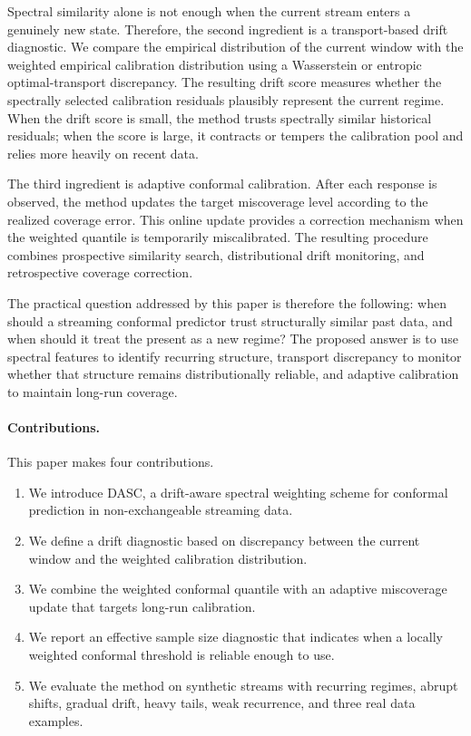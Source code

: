 \documentclass[11pt]{article}
\begin{document}
Spectral similarity alone is not enough when the current stream enters a genuinely new state. Therefore, the second ingredient is a transport-based drift diagnostic. We compare the empirical distribution of the current window with the weighted empirical calibration distribution using a Wasserstein or entropic optimal-transport discrepancy. The resulting drift score measures whether the spectrally selected calibration residuals plausibly represent the current regime. When the drift score is small, the method trusts spectrally similar historical residuals; when the score is large, it contracts or tempers the calibration pool and relies more heavily on recent data.

The third ingredient is adaptive conformal calibration. After each response is observed, the method updates the target miscoverage level according to the realized coverage error. This online update provides a correction mechanism when the weighted quantile is temporarily miscalibrated. The resulting procedure combines prospective similarity search, distributional drift monitoring, and retrospective coverage correction.

The practical question addressed by this paper is therefore the following: when should a streaming conformal predictor trust structurally similar past data, and when should it treat the present as a new regime? The proposed answer is to use spectral features to identify recurring structure, transport discrepancy to monitor whether that structure remains distributionally reliable, and adaptive calibration to maintain long-run coverage.

\paragraph{Contributions.}
This paper makes four contributions.
\begin{enumerate}[label=(\roman*)]
    \item We introduce DASC, a drift-aware spectral weighting scheme for conformal prediction in non-exchangeable streaming data.
    \item We define a drift diagnostic based on discrepancy between the current window and the weighted calibration distribution.
    \item We combine the weighted conformal quantile with an adaptive miscoverage update that targets long-run calibration.
    \item We report an effective sample size diagnostic that indicates when a locally weighted conformal threshold is reliable enough to use.
    \item We evaluate the method on synthetic streams with recurring regimes, abrupt shifts, gradual drift, heavy tails, weak recurrence, and three real data examples.
\end{enumerate}
\end{document}

